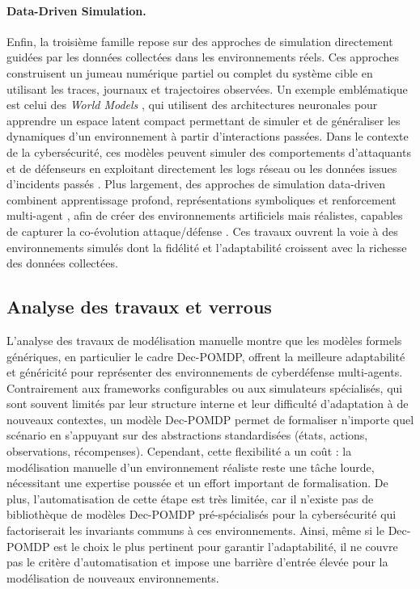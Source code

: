 \paragraph{Data-Driven Simulation.}
Enfin, la troisième famille repose sur des approches de simulation directement guidées par les données collectées dans les environnements réels. Ces approches construisent un jumeau numérique partiel ou complet du système cible en utilisant les traces, journaux et trajectoires observées. Un exemple emblématique est celui des \textit{World Models} \cite{Ha2018}, qui utilisent des architectures neuronales pour apprendre un espace latent compact permettant de simuler et de généraliser les dynamiques d’un environnement à partir d’interactions passées. Dans le contexte de la cybersécurité, ces modèles peuvent simuler des comportements d’attaquants et de défenseurs en exploitant directement les logs réseau ou les données issues d’incidents passés \cite{D2mbiT0vgP4J}. Plus largement, des approches de simulation data-driven combinent apprentissage profond, représentations symboliques et renforcement multi-agent \cite{5oUSbVbTXX0J, RQyw5NYMj-wJ}, afin de créer des environnements artificiels mais réalistes, capables de capturer la co-évolution attaque/défense \cite{oOfK6FXUSCAJ}. Ces travaux ouvrent la voie à des environnements simulés dont la fidélité et l’adaptabilité croissent avec la richesse des données collectées.

\subsection*{Analyse des travaux et verrous}

L’analyse des travaux de modélisation manuelle montre que les modèles formels génériques, en particulier le cadre Dec-POMDP, offrent la meilleure adaptabilité et généricité pour représenter des environnements de cyberdéfense multi-agents. Contrairement aux frameworks configurables ou aux simulateurs spécialisés, qui sont souvent limités par leur structure interne et leur difficulté d’adaptation à de nouveaux contextes, un modèle Dec-POMDP permet de formaliser n’importe quel scénario en s’appuyant sur des abstractions standardisées (états, actions, observations, récompenses). Cependant, cette flexibilité a un coût : la modélisation manuelle d’un environnement réaliste reste une tâche lourde, nécessitant une expertise poussée et un effort important de formalisation. De plus, l’automatisation de cette étape est très limitée, car il n’existe pas de bibliothèque de modèles Dec-POMDP pré-spécialisés pour la cybersécurité qui factoriserait les invariants communs à ces environnements. Ainsi, même si le Dec-POMDP est le choix le plus pertinent pour garantir l’adaptabilité, il ne couvre pas le critère d’automatisation et impose une barrière d’entrée élevée pour la modélisation de nouveaux environnements.

